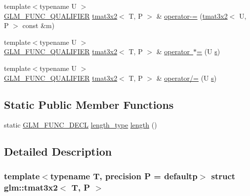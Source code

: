 \begin{DoxyCompactItemize}
{\footnotesize template$<$typename U $>$ }\\\mbox{\hyperlink{setup_8hpp_a33fdea6f91c5f834105f7415e2a64407}{G\+L\+M\+\_\+\+F\+U\+N\+C\+\_\+\+Q\+U\+A\+L\+I\+F\+I\+ER}} \mbox{\hyperlink{structglm_1_1tmat3x2}{tmat3x2}}$<$ T, P $>$ \& \mbox{\hyperlink{structglm_1_1tmat3x2_a192437e717b337e5dead355382eb0fa4}{operator-\/=}} (\mbox{\hyperlink{structglm_1_1tmat3x2}{tmat3x2}}$<$ U, P $>$ const \&m)
\item 
{\footnotesize template$<$typename U $>$ }\\\mbox{\hyperlink{setup_8hpp_a33fdea6f91c5f834105f7415e2a64407}{G\+L\+M\+\_\+\+F\+U\+N\+C\+\_\+\+Q\+U\+A\+L\+I\+F\+I\+ER}} \mbox{\hyperlink{structglm_1_1tmat3x2}{tmat3x2}}$<$ T, P $>$ \& \mbox{\hyperlink{structglm_1_1tmat3x2_a0d31f497eafcb00100f83b6b17b7da6a}{operator $\ast$=}} (U \mbox{\hyperlink{glad_8h_af1b1d5edfea6a34daee7389b1b5810ad}{s}})
\item 
{\footnotesize template$<$typename U $>$ }\\\mbox{\hyperlink{setup_8hpp_a33fdea6f91c5f834105f7415e2a64407}{G\+L\+M\+\_\+\+F\+U\+N\+C\+\_\+\+Q\+U\+A\+L\+I\+F\+I\+ER}} \mbox{\hyperlink{structglm_1_1tmat3x2}{tmat3x2}}$<$ T, P $>$ \& \mbox{\hyperlink{structglm_1_1tmat3x2_a9c34c87d7b9be6e3301bc8e9186c96bf}{operator/=}} (U \mbox{\hyperlink{glad_8h_af1b1d5edfea6a34daee7389b1b5810ad}{s}})
\end{DoxyCompactItemize}
\subsection*{Static Public Member Functions}
\begin{DoxyCompactItemize}
\item 
static \mbox{\hyperlink{setup_8hpp_ab2d052de21a70539923e9bcbf6e83a51}{G\+L\+M\+\_\+\+F\+U\+N\+C\+\_\+\+D\+E\+CL}} \mbox{\hyperlink{structglm_1_1tmat3x2_a358b949a615ed48c4dc18c53a55358df}{length\+\_\+type}} \mbox{\hyperlink{structglm_1_1tmat3x2_ae771b31ecb7a8567bb6eb08b17df1b83}{length}} ()
\end{DoxyCompactItemize}


\subsection{Detailed Description}
\subsubsection*{template$<$typename T, precision P = defaultp$>$\newline
struct glm\+::tmat3x2$<$ T, P $>$}



